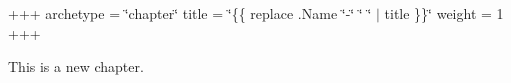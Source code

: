 +++ archetype = \char`\"{}chapter\char`\"{} title = \char`\"{}\{\{ replace .\+Name \char`\"{}-\/\char`\"{} \char`\"{} \char`\"{} $\vert$ title \}\}\char`\"{} weight = 1 +++

This is a new chapter. 